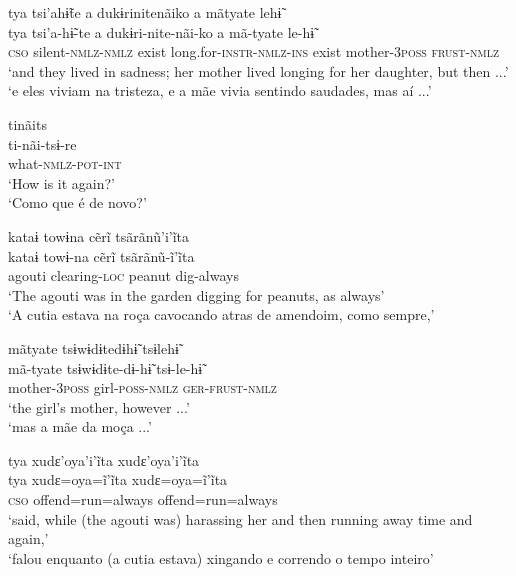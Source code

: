 \documentclass[output=paper,
modfonts,nonflat
]{langsci/langscibook}
\begin{document}
\newpage 
\ea tya tsi'ahɨ̃te a dukɨrinitenãiko a mãtyate lehɨ̃\\[.3em]
\gll tya		tsi'a-hɨ̃-te			a		dukɨri-nite-nãi-ko		a		mã-tyate		le-hɨ̃\\
\textsc{cso}	silent-\textsc{nmlz-nmlz}	exist	long.for-\textsc{instr-nmlz-ins}	exist	mother-\textsc{3poss}	\textsc{frust-nmlz}\\
\glt ‘and they lived in sadness; her mother lived longing for her daughter, but then ...’\\
‘e eles viviam na tristeza, e a mãe vivia sentindo saudades, mas aí ...'
\z

\ea tinãits\\[.3em]
\gll ti-nãi-tsɨ-re\\
what-\textsc{nmlz-pot-int}\\
\glt ‘How is it again?'{\footnotemark}\\
‘Como que é de novo?'
\z

\ea kataɨ towɨna cẽrĩ tsãrãnũ'i'ĩta\\[.3em]
\gll kataɨ	towɨ-na		cẽrĩ	tsãrãnũ-ĩ'ĩta\\
agouti	clearing-\textsc{loc}	peanut	dig-always\\
\glt ‘The agouti was in the garden digging for peanuts, as always’\\
‘A cutia estava na roça cavocando atras de amendoim, como sempre,'
\z

\ea mãtyate tsɨwɨdɨtedɨhɨ̃ tsɨlehɨ̃\\[.3em]
\gll mã-tyate		tsɨwɨdɨte-dɨ-hɨ̃	tsɨ-le-hɨ̃\\
mother-\textsc{3poss}	girl-\textsc{poss-nmlz}	\textsc{ger-frust-nmlz}\\
\glt ‘the girl’s mother, however ...’\\
‘mas a mãe da moça ...'
\z

\ea tya xudɛ'oya'i'ĩta xudɛ'oya'i'ĩta\\[.3em]
\gll tya	xudɛ=oya=ĩ'ĩta	xudɛ=oya=ĩ'ĩta\\
\textsc{cso}	offend=run=always	offend=run=always\\
\glt ‘said, while (the agouti was) harassing her and then running away time and again,’{\footnotemark}\\
‘falou enquanto (a cutia estava) xingando e correndo o tempo inteiro'
\z
\end{document}
